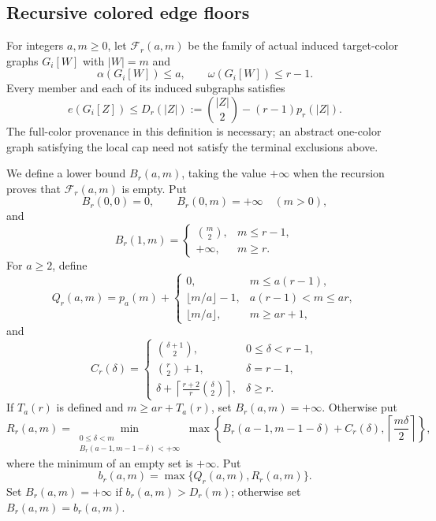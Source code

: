 \documentclass[11pt,reqno,a4paper]{amsart}
\theoremstyle{definition}
\theoremstyle{remark}
\begin{document}
\subsection{Recursive colored edge floors}

For integers $a,m\geq0$, let $\mathcal F_r(a,m)$ be the family of
actual induced target-color graphs $G_i[W]$ with $|W|=m$ and
\[
  \alpha(G_i[W])\leq a,
  \qquad \omega(G_i[W])\leq r-1.
\]
Every member and each of its induced subgraphs satisfies
\[
  e(G_i[Z])\leq D_r(|Z|)
  :=\binom{|Z|}{2}-(r-1)p_r(|Z|).
\]
The full-color provenance in this definition is necessary; an abstract
one-color graph satisfying the local cap need not satisfy the terminal
exclusions above.

We define a lower bound $B_r(a,m)$, taking the value $+\infty$ when the
recursion proves that $\mathcal F_r(a,m)$ is empty. Put
\[
 B_r(0,0)=0,
 \qquad B_r(0,m)=+\infty\quad(m>0),
\]
and
\[
 B_r(1,m)=
 \begin{cases}
  \binom m2,&m\leq r-1,\\
  +\infty,&m\geq r.
 \end{cases}
\]
For $a\geq2$, define
\begin{equation}\label{eq:Qr}
 Q_r(a,m)=p_a(m)+
 \begin{cases}
  0,&m\leq a(r-1),\\
  \lfloor m/a\rfloor-1,&a(r-1)<m\leq ar,\\
  \lfloor m/a\rfloor,&m\geq ar+1,
 \end{cases}
\end{equation}
and
\begin{equation}\label{eq:Cr}
 C_r(\delta)=
 \begin{cases}
  \binom{\delta+1}{2},&0\leq\delta<r-1,\\
  \binom r2+1,&\delta=r-1,\\
  \displaystyle \delta+
  \left\lceil\frac{r+2}{r}\binom\delta2\right\rceil,&\delta\geq r.
 \end{cases}
\end{equation}
If $T_a(r)$ is defined and $m\geq ar+T_a(r)$, set
$B_r(a,m)=+\infty$. Otherwise put
\begin{equation}\label{eq:Rr}
 R_r(a,m)=
 \min_{\substack{0\leq\delta<m\\
 B_r(a-1,m-1-\delta)<+\infty}}
 \max\left\{
 B_r(a-1,m-1-\delta)+C_r(\delta),
 \left\lceil\frac{m\delta}{2}\right\rceil
 \right\},
\end{equation}
where the minimum of an empty set is $+\infty$. Put
\[
 b_r(a,m)=\max\{Q_r(a,m),R_r(a,m)\}.
\]
Set $B_r(a,m)=+\infty$ if $b_r(a,m)>D_r(m)$; otherwise set
$B_r(a,m)=b_r(a,m)$.
\end{document}
